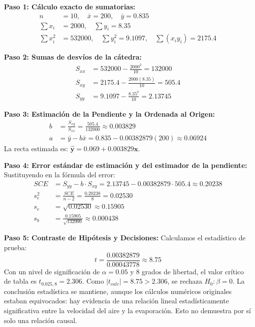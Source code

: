 \documentclass[11pt,letterpaper]{article}
\begin{document}
\textbf{Paso 1: Cálculo exacto de sumatorias:}
\begin{align*}
    n &= 10, \quad \bar{x} = 200, \quad \bar{y} = 0.835 \\
    \sum x_i &= 2000, \quad \sum y_i = 8.35 \\
    \sum x_i^2 &= 532000, \quad \sum y_i^2 = 9.1097, \quad \sum (x_i y_i) = 2175.4
\end{align*}

\textbf{Paso 2: Sumas de desvíos de la cátedra:}
\begin{align}
    S_{xx} &= 532000 - \frac{2000^2}{10} = 132000 \\
    S_{xy} &= 2175.4 - \frac{2000(8.35)}{10} = 505.4 \\
    S_{yy} &= 9.1097 - \frac{8.35^2}{10} = 2.13745
\end{align}

\textbf{Paso 3: Estimación de la Pendiente y la Ordenada al Origen:}
\begin{align}
    b &= \frac{S_{xy}}{S_{xx}} = \frac{505.4}{132000} \approx \mathbf{0.003829} \\
    a &= \bar{y} - b \bar{x} = 0.835 - 0.00382879(200) \approx \mathbf{0.06924}
\end{align}
La recta estimada es: $\mathbf{\hat{y} = 0.069 + 0.003829x}$.

\textbf{Paso 4: Error estándar de estimación y del estimador de la pendiente:}
Sustituyendo en la fórmula del error:
\begin{align}
    SCE &= S_{yy} - b \cdot S_{xy} = 2.13745 - 0.00382879 \cdot 505.4 \approx 0.20238 \\
    s_e^2 &= \frac{SCE}{n-2} = \frac{0.20238}{8} = 0.02530 \\ 
    s_e &= \sqrt{0.02530} \approx \mathbf{0.15905} \\
    s_b &= \frac{0.15905}{\sqrt{132000}} \approx \mathbf{0.000438}
\end{align}

\textbf{Paso 5: Contraste de Hipótesis y Decisiones:}
Calculamos el estadístico de prueba:
\begin{equation}
    t = \frac{0.00382879}{0.00043778} \approx \mathbf{8.75}
\end{equation}
Con un nivel de significación de $\alpha = 0.05$ y $8$ grados de libertad, el valor crítico de tabla es $t_{0.025, 8} = 2.306$. Como $|t_{calc}| = 8.75 > 2.306$, se rechaza $H_0: \beta=0$. La conclusión estadística se mantiene, aunque los cálculos numéricos originales estaban equivocados: hay evidencia de una relación lineal estadísticamente significativa entre la velocidad del aire y la evaporación. Esto no demuestra por sí solo una relación causal.
\end{document}
